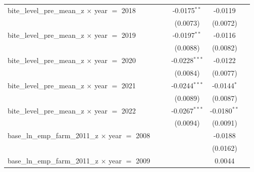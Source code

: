 \begin{tabular}{lccccc}
   bite\_level\_pre\_mean\_z $\times$ year $=$ 2018             &                    &                 & -0.0175$^{**}$        & -0.0119                    &   \\   
                                                                &                    &                 & (0.0073)              & (0.0072)                   &   \\   
   bite\_level\_pre\_mean\_z $\times$ year $=$ 2019             &                    &                 & -0.0197$^{**}$        & -0.0116                    &   \\   
                                                                &                    &                 & (0.0088)              & (0.0082)                   &   \\   
   bite\_level\_pre\_mean\_z $\times$ year $=$ 2020             &                    &                 & -0.0228$^{***}$       & -0.0122                    &   \\   
                                                                &                    &                 & (0.0084)              & (0.0077)                   &   \\   
   bite\_level\_pre\_mean\_z $\times$ year $=$ 2021             &                    &                 & -0.0244$^{***}$       & -0.0144$^{*}$              &   \\   
                                                                &                    &                 & (0.0089)              & (0.0087)                   &   \\   
   bite\_level\_pre\_mean\_z $\times$ year $=$ 2022             &                    &                 & -0.0267$^{***}$       & -0.0180$^{**}$             &   \\   
                                                                &                    &                 & (0.0094)              & (0.0091)                   &   \\   
   base\_ln\_emp\_farm\_2011\_z $\times$ year $=$ 2008          &                    &                 &                       & -0.0188                    &   \\   
                                                                &                    &                 &                       & (0.0162)                   &   \\   
   base\_ln\_emp\_farm\_2011\_z $\times$ year $=$ 2009          &                    &                 &                       & 0.0044                     &   \\   

\end{tabular}
